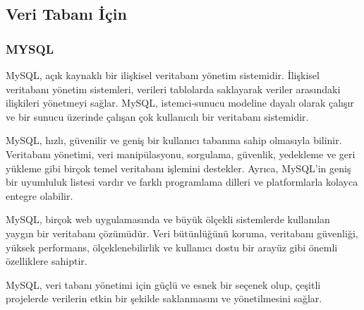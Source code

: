 \subsection{Veri Tabanı İçin }
\subsubsection{MYSQL}
MySQL, açık kaynaklı bir ilişkisel veritabanı yönetim sistemidir. İlişkisel veritabanı yönetim sistemleri, verileri tablolarda saklayarak veriler arasındaki ilişkileri yönetmeyi sağlar. MySQL, istemci-sunucu modeline dayalı olarak çalışır ve bir sunucu üzerinde çalışan çok kullanıcılı bir veritabanı sistemidir.

MySQL, hızlı, güvenilir ve geniş bir kullanıcı tabanına sahip olmasıyla bilinir. Veritabanı yönetimi, veri manipülasyonu, sorgulama, güvenlik, yedekleme ve geri yükleme gibi birçok temel veritabanı işlemini destekler. Ayrıca, MySQL'in geniş bir uyumluluk listesi vardır ve farklı programlama dilleri ve platformlarla kolayca entegre olabilir.

MySQL, birçok web uygulamasında ve büyük ölçekli sistemlerde kullanılan yaygın bir veritabanı çözümüdür. Veri bütünlüğünü koruma, veritabanı güvenliği, yüksek performans, ölçeklenebilirlik ve kullanıcı dostu bir arayüz gibi önemli özelliklere sahiptir.

MySQL, veri tabanı yönetimi için güçlü ve esnek bir seçenek olup, çeşitli projelerde verilerin etkin bir şekilde saklanmasını ve yönetilmesini sağlar.



